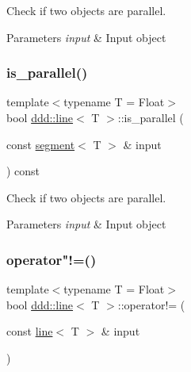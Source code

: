 Check if two objects are parallel. 


\begin{DoxyParams}{Parameters}
{\em input} & Input object \\
\hline
\end{DoxyParams}
\mbox{\label{classddd_1_1line_a2226c26de0134fda0458ade612626c10}} 
\subsubsection{\texorpdfstring{is\+\_\+parallel()}{is\_parallel()}\hspace{0.1cm}{\footnotesize\ttfamily [5/5]}}
{\footnotesize\ttfamily template$<$typename T = Float$>$ \\
bool \hyperlink{classddd_1_1line}{ddd\+::line}$<$ T $>$\+::is\+\_\+parallel (\begin{DoxyParamCaption}\item[{const \hyperlink{classddd_1_1segment}{segment}$<$ T $>$ \&}]{input }\end{DoxyParamCaption}) const\hspace{0.3cm}{\ttfamily [inline]}}



Check if two objects are parallel. 


\begin{DoxyParams}{Parameters}
{\em input} & Input object \\
\hline
\end{DoxyParams}
\mbox{\label{classddd_1_1line_a1ff398ce69c656f9f51fc307f0753d10}} 
\subsubsection{\texorpdfstring{operator"!=()}{operator!=()}}
{\footnotesize\ttfamily template$<$typename T = Float$>$ \\
bool \hyperlink{classddd_1_1line}{ddd\+::line}$<$ T $>$\+::operator!= (\begin{DoxyParamCaption}\item[{const \hyperlink{classddd_1_1line}{line}$<$ T $>$ \&}]{input }\end{DoxyParamCaption})\hspace{0.3cm}{\ttfamily [inline]}}



